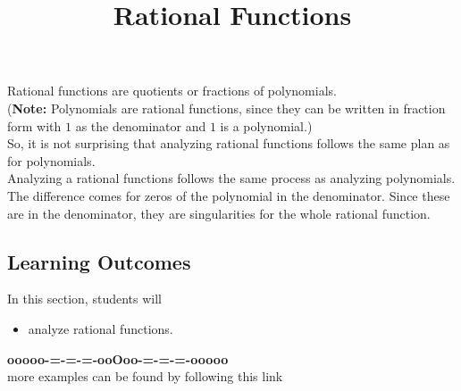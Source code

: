 \documentclass{ximera}
\title{Rational Functions}
\begin{document}
\begin{abstract}
\end{abstract}
\maketitle












Rational functions are quotients or fractions of polynomials.  \\


(\textbf{Note:} Polynomials are rational functions, since they can be written in fraction form with $1$ as the denominator and $1$ is a polynomial.)  \\


So, it is not surprising that analyzing rational functions follows the same plan as for polynomials. \\


Analyzing a rational functions follows the same process as analyzing polynomials.  The difference comes for zeros of the polynomial in the denominator.  Since these are in the denominator, they are singularities for the whole rational function.























\subsection*{Learning Outcomes}


\begin{sectionOutcomes}
In this section, students will 

\begin{itemize}
\item analyze rational functions.
\end{itemize}
\end{sectionOutcomes}











\begin{center}
\textbf{\textcolor{green!50!black}{ooooo-=-=-=-ooOoo-=-=-=-ooooo}} \\

more examples can be found by following this link\\ 

\end{center}
\end{document}
